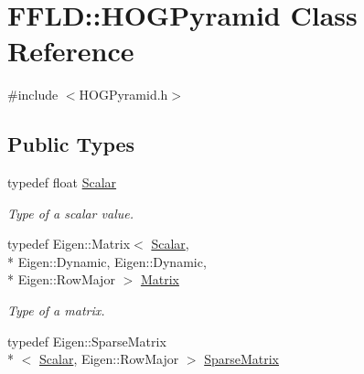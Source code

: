 \hypertarget{class_f_f_l_d_1_1_h_o_g_pyramid}{\section{F\-F\-L\-D\-:\-:H\-O\-G\-Pyramid Class Reference}
\label{class_f_f_l_d_1_1_h_o_g_pyramid}
}


{\ttfamily \#include $<$H\-O\-G\-Pyramid.\-h$>$}

\subsection*{Public Types}
\begin{DoxyCompactItemize}
\item 
\hypertarget{class_f_f_l_d_1_1_h_o_g_pyramid_af17c08ed86557e0a0aecb4814daf87c3}{typedef float \hyperlink{class_f_f_l_d_1_1_h_o_g_pyramid_af17c08ed86557e0a0aecb4814daf87c3}{Scalar}}\label{class_f_f_l_d_1_1_h_o_g_pyramid_af17c08ed86557e0a0aecb4814daf87c3}

\begin{DoxyCompactList}\small\item\em Type of a scalar value. \end{DoxyCompactList}\item 
\hypertarget{class_f_f_l_d_1_1_h_o_g_pyramid_a2618b4bd5d17f05cdc108189ed5abe3a}{typedef Eigen\-::\-Matrix$<$ \hyperlink{class_f_f_l_d_1_1_h_o_g_pyramid_af17c08ed86557e0a0aecb4814daf87c3}{Scalar}, \\*
Eigen\-::\-Dynamic, Eigen\-::\-Dynamic, \\*
Eigen\-::\-Row\-Major $>$ \hyperlink{class_f_f_l_d_1_1_h_o_g_pyramid_a2618b4bd5d17f05cdc108189ed5abe3a}{Matrix}}\label{class_f_f_l_d_1_1_h_o_g_pyramid_a2618b4bd5d17f05cdc108189ed5abe3a}

\begin{DoxyCompactList}\small\item\em Type of a matrix. \end{DoxyCompactList}\item 
\hypertarget{class_f_f_l_d_1_1_h_o_g_pyramid_a7f1784cd0a524bd5a2ecdd6e0dc98c35}{typedef Eigen\-::\-Sparse\-Matrix\\*
$<$ \hyperlink{class_f_f_l_d_1_1_h_o_g_pyramid_af17c08ed86557e0a0aecb4814daf87c3}{Scalar}, Eigen\-::\-Row\-Major $>$ \hyperlink{class_f_f_l_d_1_1_h_o_g_pyramid_a7f1784cd0a524bd5a2ecdd6e0dc98c35}{Sparse\-Matrix}}\label{class_f_f_l_d_1_1_h_o_g_pyramid_a7f1784cd0a524bd5a2ecdd6e0dc98c35}


\end{DoxyCompactItemize}
